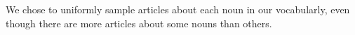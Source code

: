 We chose to uniformly sample articles about each noun in our vocabularly,
even though there are more articles about some nouns than others.
